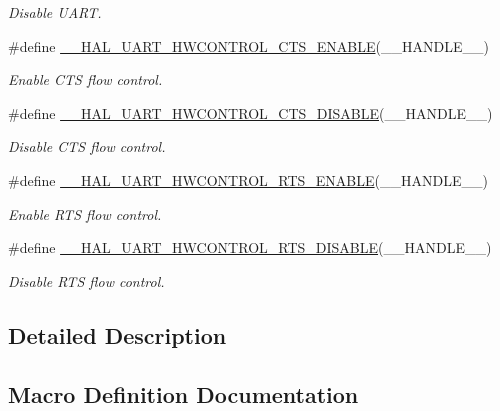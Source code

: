 \begin{DoxyCompactItemize}
\begin{DoxyCompactList}\small\item\em Disable U\+A\+RT. \end{DoxyCompactList}\item 
\#define \mbox{\hyperlink{group___u_a_r_t___exported___macros_ga4a77213945844bca4c22ba6a14b7ee4c}{\+\_\+\+\_\+\+H\+A\+L\+\_\+\+U\+A\+R\+T\+\_\+\+H\+W\+C\+O\+N\+T\+R\+O\+L\+\_\+\+C\+T\+S\+\_\+\+E\+N\+A\+B\+LE}}(\+\_\+\+\_\+\+H\+A\+N\+D\+L\+E\+\_\+\+\_\+)
\begin{DoxyCompactList}\small\item\em Enable C\+TS flow control. \end{DoxyCompactList}\item 
\#define \mbox{\hyperlink{group___u_a_r_t___exported___macros_ga0a26cb3a576c2700f76a7c697c86a499}{\+\_\+\+\_\+\+H\+A\+L\+\_\+\+U\+A\+R\+T\+\_\+\+H\+W\+C\+O\+N\+T\+R\+O\+L\+\_\+\+C\+T\+S\+\_\+\+D\+I\+S\+A\+B\+LE}}(\+\_\+\+\_\+\+H\+A\+N\+D\+L\+E\+\_\+\+\_\+)
\begin{DoxyCompactList}\small\item\em Disable C\+TS flow control. \end{DoxyCompactList}\item 
\#define \mbox{\hyperlink{group___u_a_r_t___exported___macros_ga017ec9001ff33136f87cc4034b2709a6}{\+\_\+\+\_\+\+H\+A\+L\+\_\+\+U\+A\+R\+T\+\_\+\+H\+W\+C\+O\+N\+T\+R\+O\+L\+\_\+\+R\+T\+S\+\_\+\+E\+N\+A\+B\+LE}}(\+\_\+\+\_\+\+H\+A\+N\+D\+L\+E\+\_\+\+\_\+)
\begin{DoxyCompactList}\small\item\em Enable R\+TS flow control. \end{DoxyCompactList}\item 
\#define \mbox{\hyperlink{group___u_a_r_t___exported___macros_ga8c034e96ad8f263cafeb5898ff7311fd}{\+\_\+\+\_\+\+H\+A\+L\+\_\+\+U\+A\+R\+T\+\_\+\+H\+W\+C\+O\+N\+T\+R\+O\+L\+\_\+\+R\+T\+S\+\_\+\+D\+I\+S\+A\+B\+LE}}(\+\_\+\+\_\+\+H\+A\+N\+D\+L\+E\+\_\+\+\_\+)
\begin{DoxyCompactList}\small\item\em Disable R\+TS flow control. \end{DoxyCompactList}\end{DoxyCompactItemize}


\subsection{Detailed Description}


\subsection{Macro Definition Documentation}
\mbox{\label{group___u_a_r_t___exported___macros_gae1dfc7777b089a10464841045b524caa}} 
